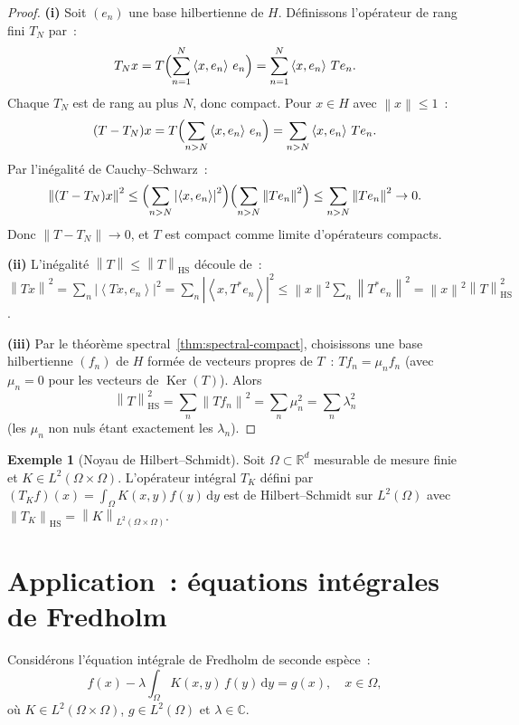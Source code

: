 \documentclass[a4paper,12pt]{book}
\DeclareMathOperator{\Ker}{Ker}
\newcommand{\R}{\mathbb{R}}
\newcommand{\C}{\mathbb{C}}
\newcommand{\dd}{\mathrm{d}}
\newcommand{\norm}[1]{\left\| #1 \right\|}
\newcommand{\abs}[1]{\left| #1 \right|}
\newcommand{\inner}[2]{\left\langle #1, #2 \right\rangle}
\theoremstyle{definition}
\newtheorem{exemple}[definition]{Exemple}
\theoremstyle{plain}
\theoremstyle{remark}
\begin{document}
\begin{proof}
\textbf{(i)} Soit $(e_n)$ une base hilbertienne de $H$. Définissons l'opérateur de rang
fini $T_N$ par~:
\[
  T_N x = T\Bigl(\sum_{n=1}^N \inner{x}{e_n}\,e_n\Bigr)
        = \sum_{n=1}^N \inner{x}{e_n}\, Te_n.
\]
Chaque $T_N$ est de rang au plus $N$, donc compact. Pour $x \in H$ avec $\norm{x} \le 1$~:
\[
  (T - T_N)x = T\Bigl(\sum_{n > N} \inner{x}{e_n}\,e_n\Bigr)
             = \sum_{n > N} \inner{x}{e_n}\, Te_n.
\]
Par l'inégalité de Cauchy--Schwarz~:
\[
  \norm{(T - T_N)x}^2
    \le \Bigl(\sum_{n > N} \abs{\inner{x}{e_n}}^2\Bigr)
        \Bigl(\sum_{n > N} \norm{Te_n}^2\Bigr)
    \le \sum_{n > N} \norm{Te_n}^2 \to 0.
\]
Donc $\norm{T - T_N} \to 0$, et $T$ est compact comme limite d'opérateurs compacts.

\textbf{(ii)} L'inégalité $\norm{T} \le \norm{T}_{\mathrm{HS}}$ découle de~:
$\norm{Tx}^2 = \sum_n \abs{\inner{Tx}{e_n}}^2 = \sum_n \abs{\inner{x}{T^*e_n}}^2
\le \norm{x}^2 \sum_n \norm{T^*e_n}^2 = \norm{x}^2 \norm{T}_{\mathrm{HS}}^2$.

\textbf{(iii)} Par le théorème spectral~\ref{thm:spectral-compact}, choisissons une base
hilbertienne $(f_n)$ de $H$ formée de vecteurs propres de $T$~: $Tf_n = \mu_n f_n$
(avec $\mu_n = 0$ pour les vecteurs de $\Ker(T)$). Alors
\[
  \norm{T}_{\mathrm{HS}}^2 = \sum_n \norm{Tf_n}^2 = \sum_n \mu_n^2 = \sum_n \lambda_n^2
\]
(les $\mu_n$ non nuls étant exactement les $\lambda_n$).
\end{proof}

\begin{exemple}[Noyau de Hilbert--Schmidt]
\label{ex:hs-integral}
Soit $\Omega \subset \R^d$ mesurable de mesure finie et $K \in L^2(\Omega \times \Omega)$.
L'opérateur intégral $T_K$ défini par
$(T_K f)(x) = \int_\Omega K(x,y)f(y)\,\dd y$ est de Hilbert--Schmidt sur $L^2(\Omega)$
avec $\norm{T_K}_{\mathrm{HS}} = \norm{K}_{L^2(\Omega \times \Omega)}$.
\end{exemple}

\section{Application~: équations intégrales de Fredholm}

Considérons l'équation intégrale de Fredholm de seconde espèce~:
\begin{equation}
\label{eq:fredholm-integrale}
  f(x) - \lambda \int_\Omega K(x,y)\, f(y) \, \dd y = g(x), \quad x \in \Omega,
\end{equation}
où $K \in L^2(\Omega \times \Omega)$, $g \in L^2(\Omega)$ et $\lambda \in \C$.
\end{document}

